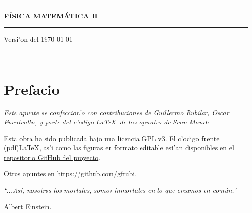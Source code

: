 \documentclass[letterpaper,11pt]{report}
\begin{document}
\thispagestyle{empty}
\begin{center}

\ 

\vspace{6.5cm}

\rule{15cm}{0.1cm}

\vspace{1.5cm}

{\huge \textsc{\textbf{F\'ISICA MATEM\'ATICA II}}}

\vspace{1.5cm}

\rule{15cm}{0.1cm}

\vspace{1.5cm}

Versi'on del \today

\end{center}


\newpage
\thispagestyle{empty}
\ \\
\newpage
\setcounter{page}{1}

\pagestyle{plain}
\chapter*{Prefacio}
\bigskip
\bigskip
\bigskip
\bigskip
\bigskip
\bigskip



\bigskip\emph{Este apunte se confeccion'o con contribuciones de Guillermo Rubilar, Oscar Fuentealba, y parte del c'odigo \LaTeX\, de los apuntes de Sean Mauch \cite{Mauch}.} 

\bigskip
\bigskip
\bigskip
\bigskip
\bigskip



Esta obra ha sido publicada bajo una \href{https://github.com/gfrubi/FM2/blob/master/LICENSE}{licencia GPL v3}. El c'odigo fuente (pdf)\LaTeX, as'i como las figuras en formato editable est'an disponibles en el \href{https://github.com/gfrubi/FM2}{repositorio GitHub del proyecto}.

\bigskip
\bigskip
\bigskip
\bigskip
\bigskip
\bigskip

Otros apuntes en \url{https://github.com/gfrubi}.

\bigskip
\bigskip
\bigskip
\bigskip
\bigskip
\bigskip





\emph{\textquotedblleft ...As\'i, nosotros los mortales, somos
inmortales en lo que creamos en com\'un."}

\begin{flushright}
Albert Einstein.
\end{flushright}
\newpage

\tableofcontents
{}
\setcounter{page}{1}








\appendix





\end{document}
